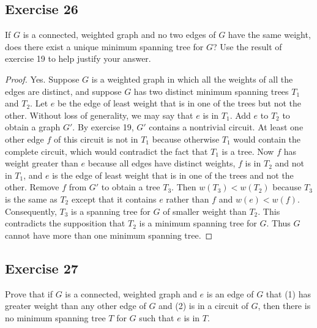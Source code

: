 \documentclass[14pt]{extarticle}
\begin{document}
\subsection{Exercise 26}
If \(G\) is a connected, weighted graph and no two edges of \(G\) have the same weight, does there exist a unique minimum
spanning tree for \(G\)? Use the result of exercise 19 to help justify your answer.

\begin{proof}
    Yes. Suppose \(G\) is a weighted graph in which all the weights of all the edges are distinct, and suppose \(G\) has
    two distinct minimum spanning trees \(T_1\) and \(T_2\). Let \(e\) be the edge of least weight that is in one of the trees
    but not the other. Without loss of generality, we may say that \(e\) is in \(T_1\). Add \(e\) to \(T_2\) to obtain a graph
    \(G'\). By exercise 19, \(G'\) contains a nontrivial circuit. At least one other edge \(f\) of this circuit is not in
    \(T_1\) because otherwise \(T_1\) would contain the complete circuit, which would contradict the fact that \(T_1\) is a
    tree. Now \(f\) has weight greater than \(e\) because all edges have distinct weights, \(f\) is in \(T_2\) and not in
    \(T_1\), and \(e\) is the edge of least weight that is in one of the trees and not the other. Remove \(f\) from \(G'\) to
    obtain a tree \(T_3\). Then \(w(T_3) < w(T_2)\) because \(T_3\) is the same as \(T_2\) except that it contains \(e\)
    rather than \(f\) and \(w(e) < w(f)\). Consequently, \(T_3\) is a spanning tree for \(G\) of smaller weight than \(T_2\).
    This contradicts the supposition that \(T_2\) is a minimum spanning tree for \(G\). Thus \(G\) cannot have more than one
    minimum spanning tree.
\end{proof}

\subsection{Exercise 27}
Prove that if \(G\) is a connected, weighted graph and \(e\) is an edge of \(G\) that (1) has greater weight than any other
edge of \(G\) and (2) is in a circuit of \(G\), then there is no minimum spanning tree \(T\) for \(G\) such that
\(e\) is in \(T\).
\end{document}
